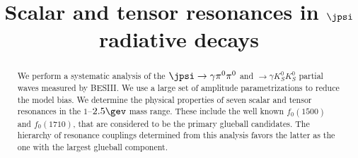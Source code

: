\documentclass[10pt,aps,prd,amsmath,amssymb,superscriptaddress,onecolumn,nofootinbib,showpacs,preprintnumbers,amsfonts, notitlepage]{revtex4-1}
\begin{document}
\title{\boldmath Scalar and tensor resonances in $\jpsi$ radiative decays}



\begin{abstract}
We perform a systematic analysis of the 
$\jpsi \to \gamma \pi^0\pi^0$ and $\to \gamma K_S^0 K_S^0$ partial waves measured by BESIII. We use a large set of amplitude parametrizations to reduce the model bias. We determine the physical properties of seven scalar and tensor resonances in the $1$--$2.5\gev$ mass range.  These include the well known $f_0(1500)$ and $f_0(1710)$, that are considered to be the primary glueball candidates. The hierarchy of resonance couplings determined from this analysis favors the 
 latter as the one with the largest  glueball component.
\end{abstract}
\maketitle



































\end{document}
